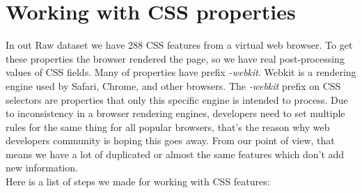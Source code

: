 \section{Working with CSS properties}
\label{sec:css}
In out Raw dataset we have 288 CSS features from a virtual web browser. To get these properties the browser rendered the page, so we have real post-processing values of CSS fields. Many of properties have prefix \textit{-webkit}. Webkit is a rendering engine used by Safari, Chrome, and other browsers. The \textit{-webkit} prefix on CSS selectors are properties that only this specific engine is intended to process. Due to inconsistency in a browser rendering engines, developers need to set multiple rules for the same thing for all popular browsers, that's the reason why web developers community is hoping this goes away. From our point of view, that means we have a lot of duplicated or almost the same features which don't add new information.\\

Here is a list of steps we made for working with CSS features:

